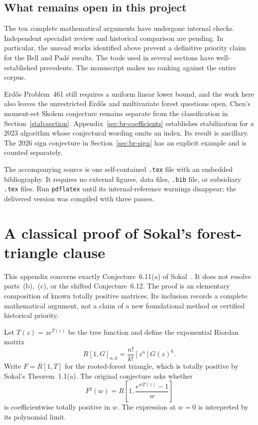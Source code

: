 \documentclass[11pt,a4paper]{article}
\theoremstyle{definition}
\theoremstyle{remark}
\numberwithin{equation}{section}
\begin{document}
\subsection{What remains open in this project}

The ten complete mathematical arguments have undergone internal checks.
Independent specialist review and historical comparison are pending.
In particular, the unread works identified above prevent a definitive
priority claim for the Bell and Pad\'e results. The tools used in
several sections have well-established precedents. The manuscript
makes no ranking against the entire corpus.

Erd\H{o}s Problem~461 still requires a uniform linear lower bound, and
the work here also leaves the unrestricted Erd\H{o}s and multivariate
forest questions open. Chen's moment-set Skolem conjecture remains
separate from the classification in Section~\ref{stab:section}.
Appendix~\ref{sec:br-coefficients} establishes stabilization for a
2023 algorithm whose conjectural wording omits an index. Its result
is ancillary. The 2026 sign conjecture in Section~\ref{sec:br-sign}
has an explicit example and is counted separately.

The accompanying source is one self-contained \texttt{.tex} file with an
embedded bibliography. It requires no external figures, data files,
\texttt{.bib} file, or subsidiary \texttt{.tex} files. Run
\texttt{pdflatex} until its internal-reference warnings disappear;
the delivered version was compiled with three passes.

\appendix
\section{A classical proof of Sokal's forest-triangle clause}
\label{app:forest-triangle}

This appendix concerns exactly Conjecture~6.11(a) of
Sokal~\cite{Sokal2022}. It does not resolve parts~(b),~(c), or the shifted
Conjecture~6.12. The proof is an elementary composition of known totally
positive matrices. Its inclusion records a complete mathematical argument,
not a claim of a new foundational method or certified historical priority.

Let $T(z)=ze^{T(z)}$ be the tree function and define the exponential
Riordan matrix
\[
 R[1,G]_{n,k}=\frac{n!}{k!}[z^n]G(z)^k.
\]
Write $F=R[1,T]$ for the rooted-forest triangle, which is totally positive
by Sokal's Theorem~1.1(a). The original conjecture asks whether
\[
 F^{\sharp}(w)=R\left[1,\frac{e^{wT(z)}-1}{w}\right]
\]
is coefficientwise totally positive in $w$. The expression at $w=0$ is
interpreted by its polynomial limit.
\end{document}

